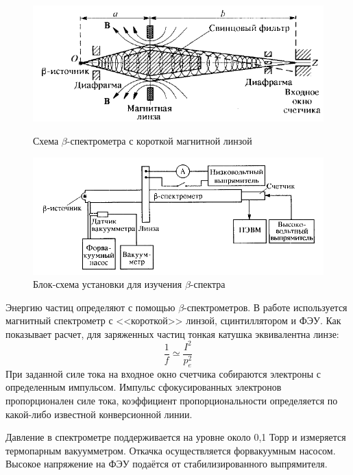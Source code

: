 \documentclass[a4paper]{article}
\begin{document}
    \begin{figure}[h]
\begin{center}
\begin{minipage}[h]{0.48\linewidth}
\includegraphics[width=1\linewidth]{lens.PNG}
\caption{Схема $\beta$-спектрометра с короткой магнитной линзой} %
\end{minipage}
\hfill 
\begin{minipage}[h]{0.48\linewidth}
\includegraphics[width=1\linewidth]{setup.PNG}
\caption{Блок-схема установки для изучения $\beta$-спектра}
\label{ris:experimcoded}
\end{minipage}
\end{center}
\end{figure}

Энергию частиц определяют с помощью $\beta$-спектрометров. В работе используется магнитный спектрометр с <<короткой>> линзой, сцинтиллятором и ФЭУ. Как показывает расчет, для заряженных частиц тонкая катушка эквивалентна линзе:
		\begin{equation}
			\frac{1}{f} \simeq \frac{I^2}{p_e^2}
		\end{equation}
	При заданной силе тока на входное окно счетчика собираются электроны с определенным импульсом. Импульс сфокусированных электронов пропорционален силе тока, коэффициент пропорциональности определяется по какой-либо известной конверсионной линии. \par
	Давление в спектрометре поддерживается на уровне около 0,1 Торр и измеряется термопарным вакуумметром. Откачка осуществляется форвакуумным насосом. Высокое напряжение на ФЭУ подаётся от стабилизированного выпрямителя.
\end{document}
